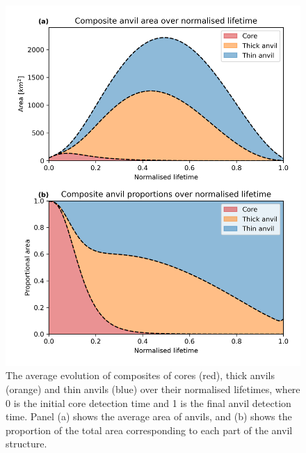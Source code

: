 \begin{figure}[tp]
    \centering
    \includegraphics[width=\textwidth]{figures/chapter3_03.png}
    \caption[
    The average evolution of composites of cores (red), thick anvils (orange) and thin anvils (blue) over their normalised lifetimes
    ]{
    The average evolution of composites of cores (red), thick anvils (orange) and thin anvils (blue) over their normalised lifetimes, where 0 is the initial core detection time and 1 is the final anvil detection time. Panel (a) shows the average area of anvils, and (b) shows the proportion of the total area corresponding to each part of the anvil structure.
    }
    \label{fig:composite_example}
\end{figure}

